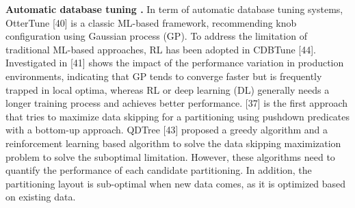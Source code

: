 \noindent\textbf{Automatic database tuning .} In term of automatic database tuning systems, OtterTune [40] is a classic ML-based framework, recommending knob configuration using Gaussian process (GP). To address the limitation of traditional ML-based approaches, RL has been adopted in CDBTune [44]. Investigated in [41] shows the impact of the performance variation in production environments, indicating that GP tends to converge faster but is frequently trapped in local optima, whereas RL or deep learning (DL) generally needs a longer training process and achieves better performance.  [37] is the first approach that tries to maximize data skipping for a partitioning using pushdown predicates with a bottom-up approach. QDTree [43] proposed a greedy algorithm and a reinforcement learning based algorithm to solve the data skipping maximization problem to solve the suboptimal limitation. However, these algorithms need to quantify the performance of each candidate partitioning. In addition, the partitioning layout is sub-optimal when new data comes, as it is optimized based on existing data.